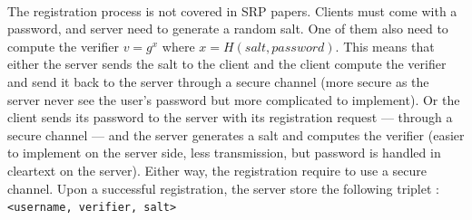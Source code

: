 ﻿\documentclass[../report.tex]{subfiles}
\begin{document}
\paragraph{}
The registration process is not covered in SRP papers.
Clients must come with a password, and server need to generate a random salt. One of them also need to compute the verifier $v = g^x$ where $x = H(salt, password)$.
This means that either the server sends the salt to the client and the client compute the verifier and send it back to the server through a secure channel (more secure as the server never see the user's password but more complicated to implement).
Or the client sends its password to the server with its registration request --- through a secure channel --- and the server generates a salt and computes the verifier (easier to implement on the server side, less transmission, but password is handled in cleartext on the server).
Either way, the registration require to use a secure channel.
Upon a successful registration, the server store the following triplet : \\
\verb|<username, verifier, salt>|



\end{document}
